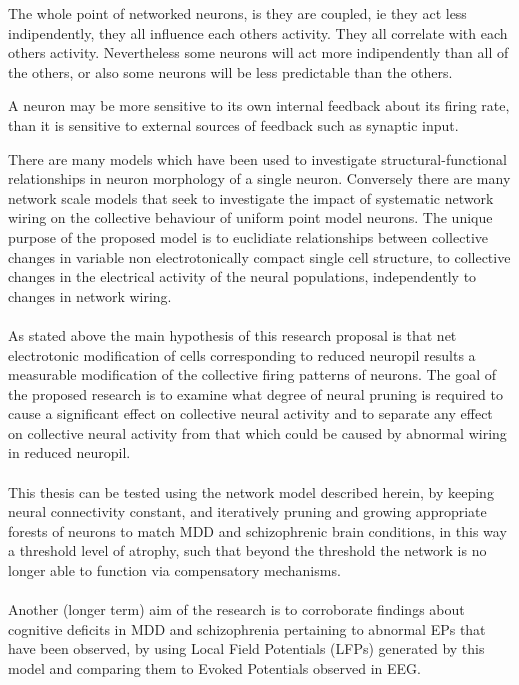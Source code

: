 \documentclass[a4paper,11pt]{article}
\begin{document}
The whole point of networked neurons, is they are coupled, ie they act less indipendently, they all influence each others activity. They all correlate with each others activity. Nevertheless some neurons will act more indipendently than all of the others, or also some neurons will be less predictable than the others.

A neuron may be more sensitive to its own internal feedback about its firing rate, than it is sensitive to external sources of feedback such as synaptic input.


There are many models which have been used to investigate structural-functional relationships in neuron morphology of a single neuron\cite{caze2013passive}\cite{carnevale1997comparative}\cite{Destexhe:2007}. Conversely there are many network scale models that seek to investigate the impact of systematic network wiring on the collective behaviour of uniform point model neurons\cite{kerr2012electrostimulation}\cite{neymotin2011synaptic}. The unique purpose of the proposed model is to euclidiate relationships between collective changes in variable non electrotonically compact single cell structure, to collective changes in the electrical activity of the neural populations, independently to changes in network wiring.\\
\\
As stated above the main hypothesis of this research proposal is that net electrotonic modification of cells corresponding to reduced neuropil results a measurable modification of the collective firing patterns of neurons. The goal of the proposed research is to examine what degree of neural pruning is required to cause a significant effect on collective neural activity and to separate any effect on collective neural activity from that which could be caused by abnormal wiring in reduced neuropil.\\
\\
This thesis can be tested using the network model described herein, by keeping neural connectivity constant, and iteratively pruning and growing appropriate forests of neurons to match MDD and schizophrenic brain conditions, in this way a threshold level of atrophy, such that beyond the threshold the network is no longer able to function via compensatory mechanisms.\\ %
\\
Another (longer term) aim of the research is to corroborate findings about cognitive deficits in MDD and schizophrenia pertaining to abnormal EPs that have been observed\cite{sur2009event}, by using Local Field Potentials (LFPs) generated by this model and comparing them to Evoked Potentials observed in EEG\cite{frodl2006reduced}.\\
\\
\end{document}

